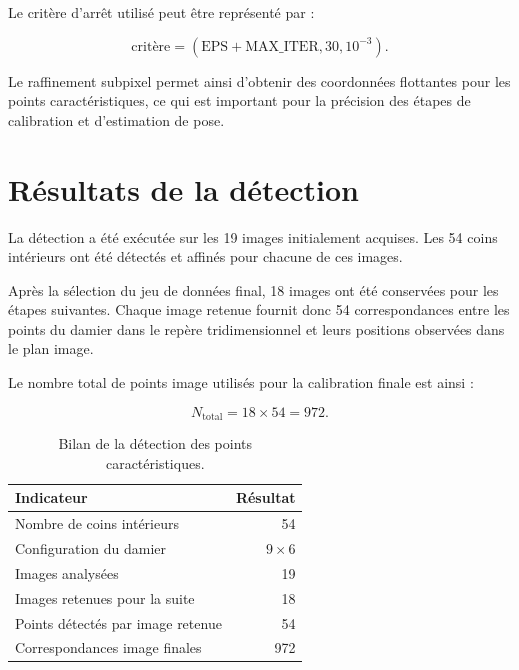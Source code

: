 \documentclass[12pt,a4paper]{report}
\begin{document}
Le critère d'arrêt utilisé peut être représenté
par :

\begin{equation}
    \text{critère} =
    \left(
        \text{EPS} + \text{MAX\_ITER},
        30,
        10^{-3}
    \right).
\end{equation}

Le raffinement subpixel permet ainsi d'obtenir
des coordonnées flottantes pour les points
caractéristiques, ce qui est important pour
la précision des étapes de calibration et
d'estimation de pose.

\section{Résultats de la détection}

La détection a été exécutée sur les 19 images
initialement acquises. Les 54 coins intérieurs
ont été détectés et affinés pour chacune de ces
images.

Après la sélection du jeu de données final,
18 images ont été conservées pour les étapes
suivantes. Chaque image retenue fournit donc
54 correspondances entre les points du damier
dans le repère tridimensionnel et leurs positions
observées dans le plan image.

Le nombre total de points image utilisés pour
la calibration finale est ainsi :

\begin{equation}
    N_{\mathrm{total}} = 18 \times 54 = 972.
\end{equation}

\begin{table}[H]
    \centering
    \caption{Bilan de la détection des points caractéristiques.}
    \label{tab:detection}
    \begin{tabular}{lr}
        \toprule
        \textbf{Indicateur} & \textbf{Résultat} \\
        \midrule
        Nombre de coins intérieurs & 54 \\
        Configuration du damier & $9 \times 6$ \\
        Images analysées & 19 \\
        Images retenues pour la suite & 18 \\
        Points détectés par image retenue & 54 \\
        Correspondances image finales & 972 \\
        \bottomrule
    \end{tabular}
\end{table}
\end{document}
